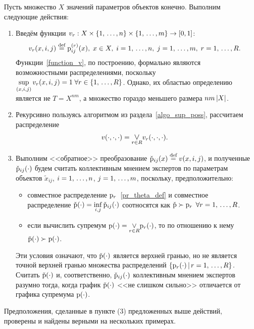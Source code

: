Пусть множество $X$ значений параметров объектов конечно. Выполним следующие действия:
\begin{enumerate}
	\item Введём функции $v_r: X \times \{1,\, \ldots, n\} \times \{1,\, \ldots, m\} \rightarrow [0,1]$:
		  \begin{equation}
		      \label{function_v}
		      v_r(x, i, j) \overset{\text{def}}{=} {\mathrm{p}}_{ij}^{(r)}(x),\; x \in X, \; i = 1,\, \ldots, n,\; j = 1,\, \ldots, m,\; r = 1,\, \ldots, R.
		  \end{equation}
		  Функции~\eqref{function_v}, по построению, формально являются возможностными распределениями, поскольку $  \underset{(x,i,j)} \sup \,v_r(x,i,j) = 1\; \forall r \in \{1,\, \ldots, R\}$. Однако, их областью определению является не $T = X^{nm}$, а множество гораздо меньшего размера $nm\left| X \right|$.
	\item Рекурсивно пользуясь алгоритмом из раздела~\ref{algo_sup_poss}, рассчитаем распределение 
	\begin{equation*}	
	      v(\cdot,\cdot,\cdot) = \underset{r \in R} {\mathlarger \vee}  v_r(\cdot,\cdot,\cdot).
	\end{equation*}	
	\item Выполним <<обратное>> преобразование $\check{{\mathrm{p}}}_{ij}(x) \overset{\text{def}}{=} v(x, i,j)$, и полученные $\check{{\mathrm{p}}}_{ij}(\cdot)$ будем  считать коллективным мнением экспертов по параметрам объектов $\tilde x_{ij}$, $i = 1,\, \ldots, n$, $j = 1,\, \ldots, m$, поскольку, предположительно: 
	\begin{itemize}
	    \item
	    совместное распределение ${\mathrm{p}}_r$~\eqref{pr_theta_def} %
	    и совместное распределение $\check{{\mathrm{p}}}(\cdot) = \underset{i,j}\inf\, \check{{\mathrm{p}}}_{ij}(\cdot)$ соотносятся как $\check{{\mathrm{p}}} \succ {\mathrm{p}}_r$  $\forall r = 1,\, \ldots, R$. 
	    \item если вычислить супремум $\p(\cdot) = \underset{r \in R} {\mathlarger \vee}  \p_r(\cdot)$, то по отношению к нему $\check{{\mathrm{p}}}(\cdot) \succ {\mathrm{p}}(\cdot)$.  
	\end{itemize}
	Эти условия означают, что $\check{{\mathrm{p}}}(\cdot)$ является верхней гранью, но не является точной верхней гранью множества распределений $\{{\mathrm{p}}_r(\cdot) \,|\, r = 1,\, \ldots, R \}$. Считать $\check{{\mathrm{p}}}(\cdot)$ и, соответственно, $\check{{\mathrm{p}}}_{ij}(\cdot)$ коллективным мнением экспертов разумно тогда, когда график $\check{{\mathrm{p}}}(\cdot)$ <<не слишком сильно>> отличается от графика супремума ${\mathrm{p}}(\cdot)$.
\end{enumerate}	

Предположения, сделанные в пункте (3) предложенных выше действий, проверены и найдены верными на нескольких примерах.

